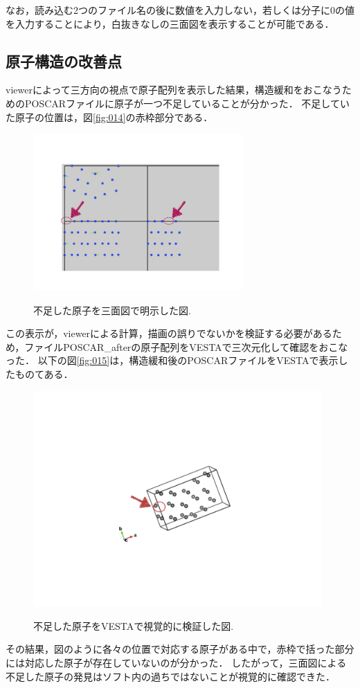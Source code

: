 なお，読み込む2つのファイル名の後に数値を入力しない，若しくは分子に0の値を入力することにより，白抜きなしの三面図を表示することが可能である．
\subsection{原子構造の改善点}
viewerによって三方向の視点で原子配列を表示した結果，構造緩和をおこなうためのPOSCARファイルに原子が一つ不足していることが分かった．
不足していた原子の位置は，図\ref{fig:014}の赤枠部分である．

\begin{figure}[htbp]\begin{center}
\includegraphics[width=8cm,bb= 0 0 937 753]{../figs/./boundary_narita.014.jpeg}
\caption{不足した原子を三面図で明示した図.}
\label{fig:014}
\label{default}\end{center}\end{figure}
この表示が，viewerによる計算，描画の誤りでないかを検証する必要があるため，ファイルPOSCAR\_afterの原子配列をVESTAで三次元化して確認をおこなった．
以下の図\ref{fig:015}は，構造緩和後のPOSCARファイルをVESTAで表示したものてある．

\begin{figure}[htbp]\begin{center}
\includegraphics[width=11cm,bb= 0 0 937 753]{../figs/./boundary_narita.015.jpeg}
\caption{不足した原子をVESTAで視覚的に検証した図.}
\label{fig:015}
\label{default}\end{center}\end{figure}
その結果，図のように各々の位置で対応する原子がある中で，赤枠で括った部分には対応した原子が存在していないのが分かった．
したがって，三面図による不足した原子の発見はソフト内の過ちではないことが視覚的に確認できた．

